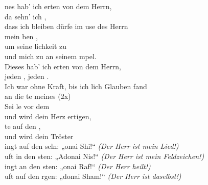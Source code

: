 
nes hab' ich erten von dem Herrn,\\
da sehn' ich ,\\
dass ich bleiben dürfe im use des Herrn\\
mein ben ,\\

um seine lichkeit zu \\
und mich zu  an seinem mpel.\\
Dieses hab' ich erten von dem Herrn,\\
jeden , jeden .\\

Ich war ohne Kraft, bis ich lich Glauben fand\\
an die te meines  (2x)\\

Sei le vor dem \\
und  wird dein Herz ertigen,\\
te auf den ,\\
und  wird dein Tröster \\


ingt auf den seln: „onai Shi!“ 	\textit{(Der Herr ist mein Lied!)}\\
uft in den sten: „Adonai Nis!“ 	\textit{(Der Herr ist mein Feldzeichen!)}\\
ingt an den sten: „onai Raf!“	\textit{(Der Herr heilt!)}\\
uft auf den rgen: „donai Sham!“ 	\textit{(Der Herr ist daselbst!)}\\